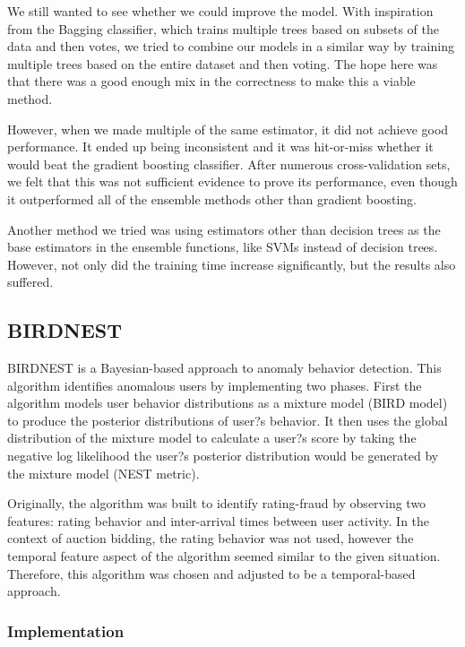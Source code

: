 \documentclass{article} %
\begin{document}
We still wanted to see whether we could improve the model.
With inspiration from the Bagging classifier, which trains multiple trees based on subsets of the data and then votes, we tried to combine our models in a similar way by training multiple trees based on the entire dataset and then voting.
The hope here was that there was a good enough mix in the correctness to make this a viable method.

However, when we made multiple of the same estimator, it did not achieve good performance.
It ended up being inconsistent and it was hit-or-miss whether it would beat the gradient boosting classifier.
After numerous cross-validation sets, we felt that this was not sufficient evidence to prove its performance, even though it outperformed all of the ensemble methods other than gradient boosting.

Another method we tried was using estimators other than decision trees as the base estimators in the ensemble functions, like SVMs instead of decision trees.
However, not only did the training time increase significantly, but the results
also suffered.

\subsection{BIRDNEST}

BIRDNEST \cite{birdnest} is a Bayesian-based approach to anomaly behavior detection. This algorithm identifies anomalous users by implementing two phases. First the algorithm models user behavior distributions as a mixture model (BIRD model) to produce the posterior distributions of user?s behavior. It then uses the global distribution of the mixture model to calculate a user?s score by taking the negative log likelihood the user?s posterior distribution would be generated by the mixture model (NEST metric).

Originally, the algorithm was built to identify rating-fraud by observing two features: rating behavior and inter-arrival times between user activity. In the context of auction bidding, the rating behavior was not used, however the temporal feature aspect of the algorithm seemed similar to the given situation. Therefore, this algorithm was chosen and adjusted to be a temporal-based approach.
	
\subsubsection{Implementation}
\end{document}

